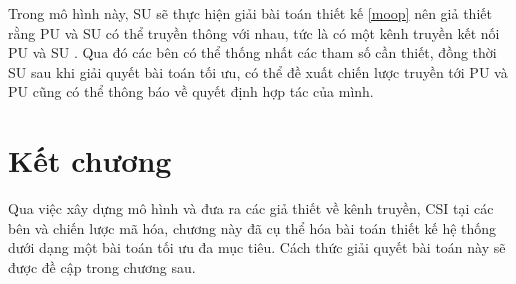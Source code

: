 \documentclass[../main.tex]{subfiles}
\begin{document}
Trong mô hình này, SU sẽ thực hiện giải bài toán thiết kế \eqref{moop} nên giả thiết rằng PU và SU có thể truyền thông với nhau, tức là có một kênh truyền kết nối PU và SU \cite{su2012active}. Qua đó các bên có thể thống nhất các tham số cần thiết, đồng thời SU sau khi giải quyết bài toán tối ưu, có thể đề xuất chiến lược truyền tới PU và PU cũng có thể thông báo về quyết định hợp tác của mình.

\section{Kết chương}

Qua việc xây dựng mô hình và đưa ra các giả thiết về kênh truyền, CSI tại các bên và chiến lược mã hóa, chương này đã cụ thể hóa bài toán thiết kế hệ thống dưới dạng một bài toán tối ưu đa mục tiêu. Cách thức giải quyết bài toán này sẽ được đề cập trong chương sau.
\end{document}
